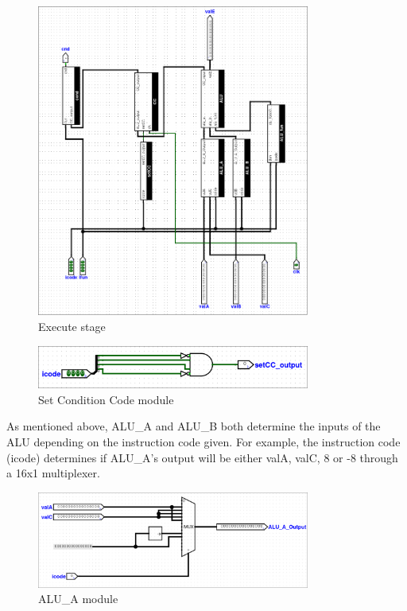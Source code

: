 \documentclass{article}
\begin{document}
\begin{figure}[H]
    \centering
    \includegraphics[width=0.8\textwidth]{./images/execute.png}
    \caption{Execute stage}
\end{figure}

\begin{figure}[H]
    \centering
    \includegraphics[width=0.8\textwidth]{./images/set_cc.png}
    \caption{Set Condition Code module}
\end{figure}

As mentioned above, ALU\_A and ALU\_B both determine the inputs of the ALU depending on the instruction code given. 
For example, the instruction code (icode) determines if ALU\_A's output will be either valA, valC, 8 or -8 through a 16x1 multiplexer. 

\begin{figure}[H]
    \centering
    \includegraphics[width=0.8\textwidth]{./images/alu_a.png}
    \caption{ALU\_A module}
\end{figure}
\end{document}
